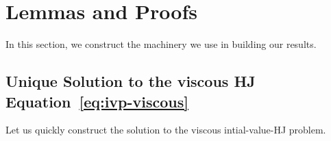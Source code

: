 \section{Lemmas and Proofs}
\label{app:proof_sol_hj_ivp}

\setcounter{appidx}{1}
\renewcommand\theequation{\Alph{appidx}.\arabic{equation}}

\setcounter{equation}{0}

In this section, we construct the machinery we use in building our results.

\subsection{Unique Solution to the viscous HJ Equation~\eqref{eq:ivp-viscous}}
Let us quickly construct the solution to the viscous intial-value-HJ problem.
%
